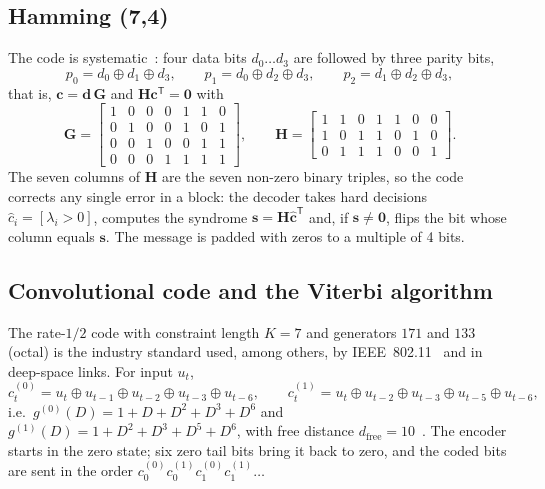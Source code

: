 \documentclass[11pt,a4paper]{article}
\theoremstyle{remark}
\begin{document}
\subsection{Hamming (7,4)}
The code is systematic~\cite{hamming}: four data bits $d_0 \dots d_3$ are followed by three parity bits,
\begin{equation}
p_0 = d_0 \oplus d_1 \oplus d_3, \qquad p_1 = d_0 \oplus d_2 \oplus d_3, \qquad p_2 = d_1 \oplus d_2 \oplus d_3,
\end{equation}
that is, $\bm{c} = \bm{d}\,\bm{G}$ and $\bm{H}\bm{c}^{\mathsf T} = \bm 0$ with
\begin{equation}
\bm G = \left[\begin{array}{cccc|ccc} 1&0&0&0&1&1&0\\ 0&1&0&0&1&0&1\\ 0&0&1&0&0&1&1\\ 0&0&0&1&1&1&1 \end{array}\right], \qquad
\bm H = \left[\begin{array}{cccc|ccc} 1&1&0&1&1&0&0\\ 1&0&1&1&0&1&0\\ 0&1&1&1&0&0&1 \end{array}\right].
\end{equation}
The seven columns of $\bm H$ are the seven non-zero binary triples, so the code corrects any single error in a block: the decoder takes hard decisions $\hat c_i = [\lambda_i > 0]$, computes the syndrome $\bm s = \bm H \hat{\bm c}^{\mathsf T}$ and, if $\bm s \neq \bm 0$, flips the bit whose column equals $\bm s$. The message is padded with zeros to a multiple of 4 bits.

\subsection{Convolutional code and the Viterbi algorithm}
\label{sec:conv}
The rate-$1/2$ code with constraint length $K = 7$ and generators $171$ and $133$ (octal) is the industry standard used, among others, by IEEE~802.11~\cite{ieee80211} and in deep-space links. For input $u_t$,
\begin{equation}
c_t^{(0)} = u_t \oplus u_{t-1} \oplus u_{t-2} \oplus u_{t-3} \oplus u_{t-6}, \qquad
c_t^{(1)} = u_t \oplus u_{t-2} \oplus u_{t-3} \oplus u_{t-5} \oplus u_{t-6},
\end{equation}
i.e.\ $g^{(0)}(D) = 1 + D + D^2 + D^3 + D^6$ and $g^{(1)}(D) = 1 + D^2 + D^3 + D^5 + D^6$, with free distance $d_{\text{free}} = 10$~\cite{lincostello}. The encoder starts in the zero state; six zero tail bits bring it back to zero, and the coded bits are sent in the order $c_0^{(0)} c_0^{(1)} c_1^{(0)} c_1^{(1)} \dots$
\end{document}
